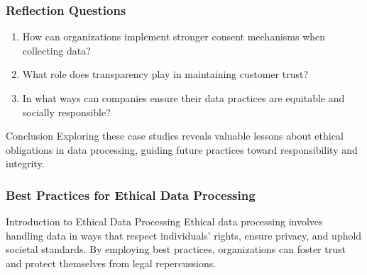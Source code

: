 \documentclass[aspectratio=169]{beamer}
\begin{document}
\begin{frame}[fragile]
    \frametitle{Reflection Questions}
    \begin{enumerate}
        \item How can organizations implement stronger consent mechanisms when collecting data?
        \item What role does transparency play in maintaining customer trust?
        \item In what ways can companies ensure their data practices are equitable and socially responsible?
    \end{enumerate}
    \begin{block}{Conclusion}
        Exploring these case studies reveals valuable lessons about ethical obligations in data processing, guiding future practices toward responsibility and integrity.
    \end{block}
\end{frame}

\begin{frame}[fragile]
    \frametitle{Best Practices for Ethical Data Processing}
    \begin{block}{Introduction to Ethical Data Processing}
        Ethical data processing involves handling data in ways that respect individuals' rights, ensure privacy, and uphold societal standards. By employing best practices, organizations can foster trust and protect themselves from legal repercussions.
    \end{block}
\end{frame}
\end{document}

